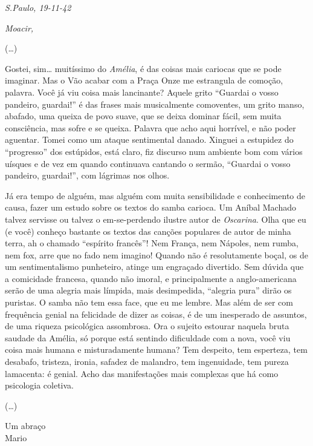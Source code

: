 \begin{flushright}
\emph{S.Paulo, 19-11-42}
\end{flushright}

\emph{Moacir,}

(\ldots{})

Gostei, sim\ldots{} muitíssimo do \emph{Amélia}, é das coisas mais cariocas
que se pode imaginar. Mas o Vão acabar com a Praça Onze me estrangula de
comoção, palavra. Você já viu coisa mais lancinante? Aquele grito
``Guardai o vosso pandeiro, guardai!'' é das frases mais musicalmente
comoventes, um grito manso, abafado, uma queixa de povo suave, que se
deixa dominar fácil, sem muita consciência, mas sofre e se queixa.
Palavra que acho aqui horrível, e não poder aguentar. Tomei como um
ataque sentimental danado. Xinguei a estupidez do ``progresso'' dos
estúpidos, está claro, fiz discurso num ambiente bom com vários uísques
e de vez em quando continuava cantando o sermão, ``Guardai o vosso
pandeiro, guardai!'', com lágrimas nos olhos.

Já era tempo de alguém, mas alguém com muita sensibilidade e
conhecimento de causa, fazer um estudo sobre os textos do samba carioca.
Um Aníbal Machado talvez servisse ou talvez o em-se-perdendo ilustre
autor de \emph{Oscarina}. Olha que eu (e você) conheço bastante os
textos das canções populares de autor de minha terra, ah o chamado
``espírito francês''! Nem França, nem Nápoles, nem rumba, nem fox, arre
que no fado nem imagino! Quando não é resolutamente boçal, os de um
sentimentalismo punheteiro, atinge um engraçado divertido. Sem dúvida
que a comicidade francesa, quando não imoral, e principalmente a
anglo-americana serão de uma alegria mais límpida, mais desimpedida,
``alegria pura'' dirão os puristas. O samba não tem essa face, que eu me
lembre. Mas além de ser com frequência genial na felicidade de dizer as
coisas, é de um inesperado de assuntos, de uma riqueza psicológica
assombrosa. Ora o sujeito estourar naquela bruta saudade da Amélia, só
porque está sentindo dificuldade com a nova, você viu coisa mais humana
e misturadamente humana? Tem despeito, tem esperteza, tem desabafo,
tristeza, ironia, safadez de malandro, tem ingenuidade, tem pureza
lamacenta: é genial. Acho das manifestações mais complexas que há como
psicologia coletiva.

(\ldots{})

\begin{flushright}
Um abraço\\
Mario
\end{flushright}


